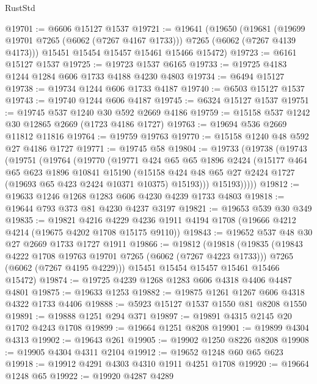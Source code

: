 \begin{lexlean}{RustStd}
\begin{coremodule}
@19701 := @6606 @15127 @1537
@19721 := @19641
    (@19650
      (@19681 (@19699 @19701 @7265 (@6062 (@7267 @4167 @1733))) @7265 (@6062 (@7267 @4139 @4173)))
      @15451
      @15454
      @15457
      @15461
      @15466
      @15472)
@19723 := @6161 @15127 @1537
@19725 := @19723 @1537 @6165
@19733 := @19725 @4183 @1244 @1284 @606 @1733 @4188 @4230 @4803
@19734 := @6494 @15127
@19738 := @19734 @1244 @606 @1733 @4187
@19740 := @6503 @15127 @1537
@19743 := @19740 @1244 @606 @4187
@19745 := @6324 @15127 @1537
@19751 := @19745 @537 @1240 @30 @592 @2669 @4186
@19759 := @15158 @537 @1242 @30 @12865 @2669 (@1723 @4186 @1727)
@19763 := @19694 @536 @2669 @11812 @11816
@19764 := @19759 @19763
@19770 := @15158 @1240 @48 @592 @27 @4186 @1727
@19771 := @19745 @58
@19804 := @19733
    (@19738
      (@19743
        (@19751
          (@19764
            (@19770
              (@19771
                @424
                @65
                @65
                @1896
                @2424
                (@15177
                  @464
                  @65
                  @623
                  @1896
                  @10841
                  @15190
                  (@15158
                    @424
                    @48
                    @65
                    @27
                    @2424
                    @1727
                    (@19693 @65 @423 @2424 @10371 @10375)
                    @15193)))
              @15193)))))
@19812 := @19633 @1246 @1268 @1283 @606 @4230 @4239 @1733 @4803
@19818 := @19644 @793 @373 @81 @4230 @4237 @3197
@19821 := @19653 @539 @30 @349
@19835 := @19821
    @4216
    @4229
    @4236
    @1911
    @4194
    @1708
    (@19666 @4212 @4214 (@19675 @4202 @1708 @15175 @9110))
@19843 := @19652 @537 @48 @30 @27 @2669 @1733 @1727 @1911
@19866 := @19812
    (@19818
      (@19835
        (@19843 @4222 @1708 @19763 @19701 @7265 (@6062 (@7267 @4223 @1733)))
        @7265
        (@6062 (@7267 @4195 @4229)))
      @15451
      @15454
      @15457
      @15461
      @15466
      @15472)
@19874 := @19725 @4239 @1268 @1283 @606 @4318 @4406 @4487 @4801
@19875 := @19633 @1253
@19882 := @19875 @1261 @1267 @606 @4318 @4322 @1733 @4406
@19888 := @5923 @15127 @1537 @1550 @81 @8208 @1550
@19891 := @19888 @1251 @294 @371
@19897 := @19891 @4315 @2145 @20 @1702 @4243 @1708
@19899 := @19664 @1251 @8208
@19901 := @19899 @4304 @4313
@19902 := @19643 @261
@19905 := @19902 @1250 @8226 @8208
@19908 := @19905 @4304 @4311 @2104
@19912 := @19652 @1248 @60 @65 @623
@19918 := @19912 @4291 @4303 @4310 @1911 @4251 @1708
@19920 := @19664 @1248 @65
@19922 := @19920 @4287 @4289

\end{coremodule}
\end{lexlean}
